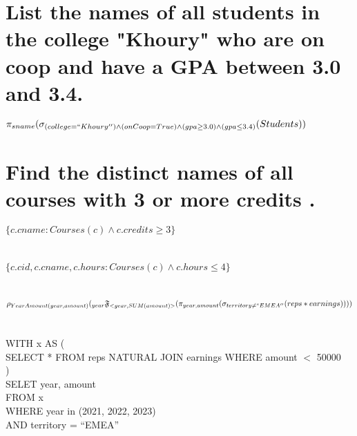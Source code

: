 \documentclass[11pt, oneside]{article}   	%
\begin{document}
\section{List the names of all students in the college "Khoury" who are on coop and have a GPA between 3.0 and 3.4.}
$\pi_{sname}(\sigma_{(college = ``Khoury'')\wedge(onCoop = True)\wedge(gpa \geq 3.0) \wedge(gpa \leq 3.4)}(Students))$

\section{Find the distinct names of all courses with 3 or more credits .}
$\{c.cname: Courses(c) \wedge c.credits \geq 3\}$

\section{}
$\{c.cid, c.cname, c.hours: Courses(c)\wedge c.hours \leq 4\}$

\section{}
$\rho_{YearAmount(year, amount)}({}_{year}\mathfrak{F}_{<year, SUM(amount)>}(\pi_{year, amount}(\sigma_{territory\neq``EMEA''}(reps * earnings))))$

\section{}
WITH x AS (\\
SELECT * FROM reps NATURAL JOIN earnings WHERE amount $<$ 50000\\
)\\
SELET year, amount\\
FROM  x\\
WHERE year in (2021, 2022, 2023)\\
AND territory = ``EMEA''\\
\end{document}

